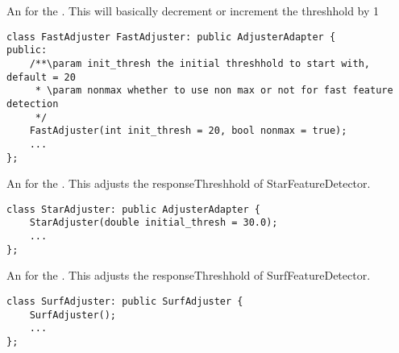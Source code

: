 An  for the . This will basically decrement or increment the
threshhold by 1

\begin{lstlisting}
class FastAdjuster FastAdjuster: public AdjusterAdapter {
public:
	/**\param init_thresh the initial threshhold to start with, default = 20
	 * \param nonmax whether to use non max or not for fast feature detection
	 */
	FastAdjuster(int init_thresh = 20, bool nonmax = true);
	...
};
\end{lstlisting}

An  for the .  This adjusts the responseThreshhold of 
StarFeatureDetector.
\begin{lstlisting}
class StarAdjuster: public AdjusterAdapter {
	StarAdjuster(double initial_thresh = 30.0);
	...
};
\end{lstlisting}


An  for the .  This adjusts the responseThreshhold of 
SurfFeatureDetector.
\begin{lstlisting}
class SurfAdjuster: public SurfAdjuster {
	SurfAdjuster();
	...
};
\end{lstlisting}
